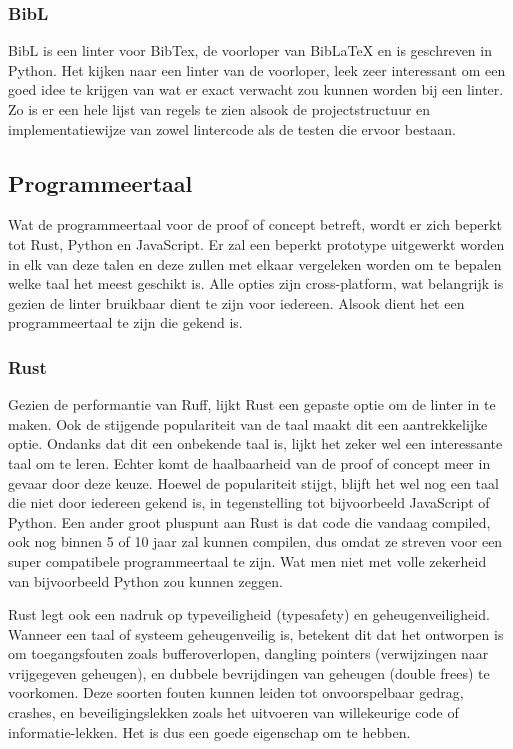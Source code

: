 \subsubsection{BibL}
BibL is een linter voor BibTex, de voorloper van BibLaTeX en is geschreven in Python. Het kijken naar een linter van de voorloper, leek zeer interessant om een goed idee te krijgen van wat er exact verwacht zou kunnen worden bij een linter. Zo is er een hele lijst van regels te zien alsook de projectstructuur en implementatiewijze van zowel lintercode als de testen die ervoor bestaan.\autocite{VanDenKerchove2020}

\subsection{Programmeertaal}

Wat de programmeertaal voor de proof of concept betreft, wordt er zich beperkt tot Rust, Python en JavaScript. Er zal een beperkt prototype uitgewerkt worden in elk van deze talen en deze zullen met elkaar vergeleken worden om te bepalen welke taal het meest geschikt is. Alle opties zijn cross-platform, wat belangrijk is gezien de linter bruikbaar dient te zijn voor iedereen. Alsook dient het een programmeertaal te zijn die gekend is.

\subsubsection{Rust}
Gezien de performantie van Ruff, lijkt Rust een gepaste optie om de linter in te maken. Ook de stijgende populariteit van de taal maakt dit een aantrekkelijke optie. Ondanks dat dit een onbekende taal is, lijkt het zeker wel een interessante taal om te leren. Echter komt de haalbaarheid van de proof of concept meer in gevaar door deze keuze. Hoewel de populariteit stijgt, blijft het wel nog een taal die niet door iedereen gekend is, in tegenstelling tot bijvoorbeeld JavaScript of Python. Een ander groot pluspunt aan Rust is dat code die vandaag compiled, ook nog binnen 5 of 10 jaar zal kunnen compilen, dus omdat ze streven voor een super compatibele programmeertaal te zijn. Wat men niet met volle zekerheid van bijvoorbeeld Python zou kunnen zeggen. 
 
Rust legt ook een nadruk op typeveiligheid (typesafety) en geheugenveiligheid. Wanneer een taal of systeem geheugenveilig is, betekent dit dat het ontworpen is om toegangsfouten zoals bufferoverlopen, dangling pointers (verwijzingen naar vrijgegeven geheugen), en dubbele bevrijdingen van geheugen (double frees) te voorkomen. Deze soorten fouten kunnen leiden tot onvoorspelbaar gedrag, crashes, en beveiligingslekken zoals het uitvoeren van willekeurige code of informatie-lekken. Het is dus een goede eigenschap om te hebben.\autocite{Klabnik2022}

